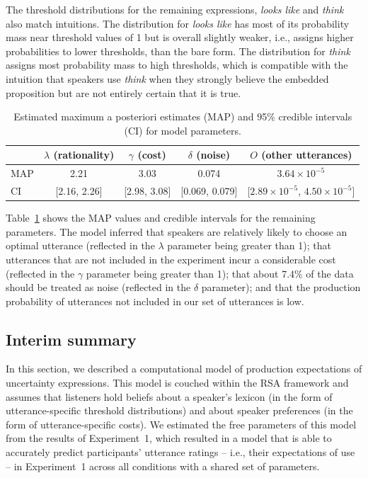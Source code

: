 \documentclass[man, floatsintext]{apa6}
\newcommand{\tableref}[1]{Table~\ref{#1}}
\begin{document}
The threshold distributions for the remaining expressions, \textit{looks like} and \textit{think} also match intuitions. The distribution for 
\textit{looks like} has most of its probability mass near threshold values of 1 but is overall slightly weaker, i.e., assigns higher probabilities to lower thresholds,
than the bare form. The distribution for \textit{think} assigns most probability mass to high thresholds, which is compatible with the intuition
that speakers use \textit{think} when they strongly believe the embedded proposition but are not entirely certain that it is true.
 
 
 \begin{table}[ht!]
\center
\begin{tabular}{l | c | c | c | c }
     & $\lambda$ (rationality) & $\gamma$ (cost) & $\delta$ (noise) & $O$ (other utterances) \\
      \midrule
      MAP & 2.21 & 3.03 & 0.074 & $3.64 \times 10^{-5}$ \\
      CI & [2.16, 2.26] & [2.98, 3.08] &  [0.069, 0.079] &[$2.89 \times 10^{-5}$, $4.50  \times 10^{-5}$] \\
      
         \end{tabular}
\caption{Estimated maximum a posteriori estimates (MAP) and 95\% credible intervals (CI) for model parameters. \label{tbl:model-params}}
\end{table}

  \tableref{tbl:model-params} shows the MAP values and credible intervals for the remaining parameters. The model inferred that speakers
  are relatively likely to choose an optimal utterance (reflected in the $\lambda$ parameter being
  greater than 1); that utterances that are not included in the experiment incur a considerable cost  (reflected in the $\gamma$ parameter being greater than 1); that about 7.4\%
  of the data should be treated as noise (reflected in the $\delta$ parameter); and that the production probability of utterances not included in our set of utterances is low. 

 
 \subsection{Interim summary}
 
 In this section, we described a computational model of production expectations of uncertainty expressions. This model
 is couched within the RSA framework and assumes that listeners hold beliefs about a speaker's lexicon (in the form
 of utterance-specific threshold distributions) and about speaker preferences (in the form of utterance-specific costs). We estimated 
 the free parameters of this model from the results of Experiment~1, which resulted in a model that is able to accurately predict
 participants' utterance ratings -- i.e., their expectations of use --  in Experiment~1 across all conditions with a shared set of parameters.
 
\end{document}

